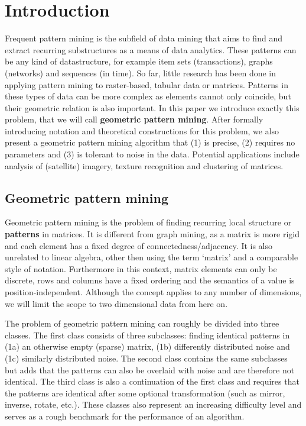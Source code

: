 \documentclass{llncs}
\begin{document}
\section{Introduction}

Frequent pattern mining is the subfield of data mining that aims to find and extract recurring substructures as a means of data analytics. These patterns can be any kind of datastructure, for example item sets (transactions), graphs (networks) and sequences (in time). So far, little research has been done in applying pattern mining to raster-based, tabular data or matrices. Patterns in these types of data can be more complex as elements cannot only coincide, but their geometric relation is also important. In this paper we introduce exactly this problem, that we will call \textbf{geometric pattern mining}. After formally introducing notation and theoretical constructions for this problem, we also present a geometric pattern mining algorithm that (1) is precise, (2) requires no parameters and (3) is tolerant to noise in the data. Potential applications include analysis of (satellite) imagery, texture recognition and clustering of matrices.

\subsection{Geometric pattern mining}

Geometric pattern mining is the problem of finding recurring local structure or \textbf{patterns} in matrices. It is different from graph mining, as a matrix is more rigid and each element has a fixed degree of connectedness/adjacency. It is also unrelated to linear algebra, other then using the term `matrix' and a comparable style of notation. Furthermore in this context, matrix elements can only be discrete, rows and columns have a fixed ordering and the semantics of a value is position-independent. Although the concept applies to any number of dimensions, we will limit the scope to two dimensional data from here on.

The problem of geometric pattern mining can roughly be divided into three classes. The first class consists of three subclasses: finding identical patterns in (1a) an otherwise empty (sparse) matrix, (1b) differently distributed noise and (1c) similarly distributed noise. The second class contains the same subclasses but adds that the patterns can also be overlaid with noise and are therefore not identical. The third class is also a continuation of the first class and requires that the patterns are identical after some optional transformation (such as mirror, inverse, rotate, etc.). These classes also represent an increasing difficulty level and serves as a rough benchmark for the performance of an algorithm. 
\end{document}
